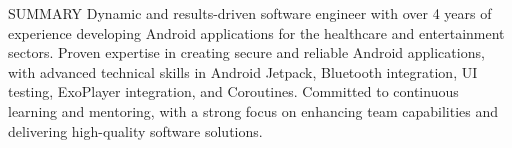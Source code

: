 \begin{rSection}{SUMMARY}
    Dynamic and results-driven software engineer with over 4 years of experience developing 
    Android applications for the healthcare and entertainment sectors. Proven expertise in 
    creating secure and reliable Android applications, with advanced technical skills in 
    Android Jetpack, Bluetooth integration, UI testing, ExoPlayer integration, and Coroutines. 
    Committed to continuous learning and mentoring, with a strong focus on enhancing team capabilities 
    and delivering high-quality software solutions.
\end{rSection}